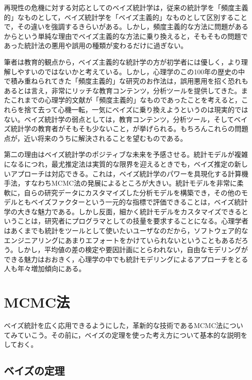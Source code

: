 \documentclass[
  a4paper,
]{ltjsbook}
\begin{document}
再現性の危機に対する対応としてのベイズ統計学は，従来の統計学を「頻度主義的」なものとして，ベイズ統計学を「ベイズ主義的」なものとして区別することで，その違いを強調するきらいがある。しかし，頻度主義的な方法に問題があるからという単純な理由でベイズ主義的な方法に乗り換えると，そもそもの問題であった統計法の悪用や誤用の種類が変わるだけに過ぎない。

筆者は教育的観点から，ベイズ主義的な統計学の方が初学者には優しく，より理解しやすいのではないかと考えている。しかし，心理学のこの100年の歴史の中で積み重ねられてきた「頻度主義的」な研究のお作法は，誤用悪用を招く恐れもあるとは言え，非常にリッチな教育コンテンツ，分析ツールを提供してきた。またこれまでの心理学的文献が「頻度主義的」なものであったことを考えると，これらを捨て去って心機一転，一気にベイズに乗り換えようというのは現実的ではない。ベイズ統計学の弱点としては，教育コンテンツ，分析ツール，そしてベイズ統計学の教育者がそもそも少ないこと，が挙げられる。もちろんこれらの問題点が，近い将来のうちに解決されることを望むものである。

第二の理由はベイズ統計学のポジティブな未来を予感させる。統計モデルが複雑になるにつれ，最尤推定法は実質的な限界を迎えるときでも，ベイズ推定の新しいアプローチは対応できる。これは，ベイズ統計学のパワーを具現化する計算機手法，すなわちMCMC法の発展によるところが大きい。統計モデルを非常に柔軟に，自らの研究データにカスタマイズした分析モデルを構築でき，その他のモデルともベイズファクターという一元的な指標で評価できることは，ベイズ統計学の大きな魅力である。しかし反面，細かく統計モデルをカスタマイズできるということは，研究者にプログラマとしての技量を要求することになる。心理学者はあくまでも統計をツールとして使いたいユーザなのだから，ソフトウェア的なエンジニアリングにあまりエフォートをかけていられないということもあるだろう。しかし，平均値の差の検定や要因計画にとらわれない，自由なモデリングができる魅力はおおきく，心理学の中でも統計モデリングによるアプローチをとる人も年々増加傾向にある。

\section{MCMC法}\label{mcmcux6cd5}

ベイズ統計を広く応用できるようにした，革新的な技術であるMCMC法についてみていこう。その前に，ベイズの定理を使った考え方について基本的な説明をしておく。

\subsection{ベイズの定理}\label{ux30d9ux30a4ux30baux306eux5b9aux7406}
\end{document}
